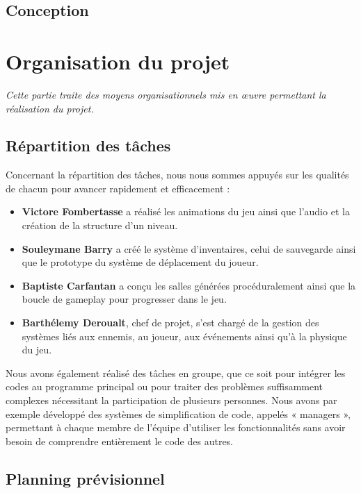 \documentclass[a4paper,11pt]{article}
\begin{document}
\subsection{Conception}
\newpage

\section{Organisation du projet}
\textit{Cette partie traite des moyens organisationnels mis en œuvre permettant la réalisation du projet.}

\subsection{Répartition des tâches}

Concernant la répartition des tâches, nous nous sommes appuyés sur les qualités de chacun pour avancer rapidement et efficacement :

\begin{itemize}[leftmargin=*]
  \item \textbf{Victore Fombertasse} a réalisé les animations du jeu ainsi que l'audio et la création de la structure d'un niveau.
  
  \item \textbf{Souleymane Barry} a créé le système d'inventaires, celui de sauvegarde ainsi que le prototype du système de déplacement du joueur.
  
  \item \textbf{Baptiste Carfantan} a conçu les salles générées procéduralement ainsi que la boucle de gameplay pour progresser dans le jeu.
  
  \item \textbf{Barthélemy Deroualt}, chef de projet, s'est chargé de la gestion des systèmes liés aux ennemis, au joueur, aux événements ainsi qu'à la physique du jeu.
\end{itemize}

Nous avons également réalisé des tâches en groupe, que ce soit pour intégrer les codes au programme principal ou pour traiter des problèmes suffisamment complexes nécessitant la participation de plusieurs personnes. Nous avons par exemple développé des systèmes de simplification de code, appelés « managers », permettant à chaque membre de l'équipe d'utiliser les fonctionnalités sans avoir besoin de comprendre entièrement le code des autres.

\subsection{Planning prévisionnel}
\end{document}
